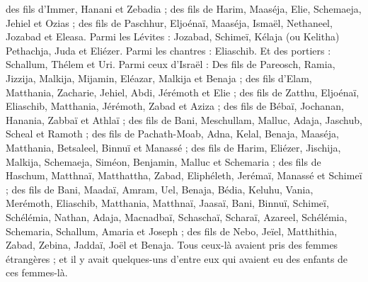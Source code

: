 \begin{multicols}{2}
des fils d'Immer, Hanani et Zebadia ;
des fils de Harim, Maaséja, Elie, Schemaeja, Jehiel et Ozias ;
des fils de Paschhur, Eljoénaï, Maaséja, Ismaël, Nethaneel, Jozabad et Eleasa.
Parmi les Lévites : Jozabad, Schimeï, Kélaja (ou Kelitha) Pethachja, Juda et Eliézer.
Parmi les chantres : Eliaschib. Et des portiers : Schallum, Thélem et Uri.
Parmi ceux d'Israël : Des fils de Pareosch, Ramia, Jizzija, Malkija, Mijamin, Eléazar, Malkija et Benaja ;
des fils d’Elam, Matthania, Zacharie, Jehiel, Abdi, Jérémoth et Elie ;
des fils de Zatthu, Eljoénaï, Eliaschib, Matthania, Jérémoth, Zabad et Aziza ;
des fils de Bébaï, Jochanan, Hanania, Zabbaï et Athlaï ;
des fils de Bani, Meschullam, Malluc, Adaja, Jaschub, Scheal et Ramoth ;
des fils de Pachath-Moab, Adna, Kelal, Benaja, Maaséja, Matthania, Betsaleel, Binnuï et Manassé ;
des fils de Harim, Eliézer, Jischija, Malkija, Schemaeja, Siméon,
Benjamin, Malluc et Schemaria ;
des fils de Haschum, Matthnaï, Matthattha, Zabad, Eliphéleth, Jerémaï, Manassé et Schimeï ;
des fils de Bani, Maadaï, Amram, Uel,
Benaja, Bédia, Keluhu,
Vania, Merémoth, Eliaschib,
Matthania, Matthnaï, Jaasaï,
Bani, Binnuï, Schimeï,
Schélémia, Nathan, Adaja,
Macnadbaï, Schaschaï, Scharaï,
Azareel, Schélémia, Schemaria,
Schallum, Amaria et Joseph ;
des fils de Nebo, Jeïel, Matthithia, Zabad, Zebina, Jaddaï, Joël et Benaja.
Tous ceux-là avaient pris des femmes étrangères ; et il y avait quelques-uns d’entre eux qui avaient eu des enfants de ces femmes-là.
\PPE{}
\end{multicols}
